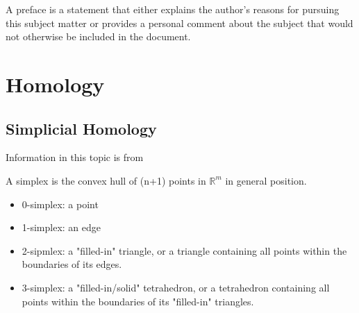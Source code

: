 \documentclass[ma]{uncgdissertationexp2}
\theoremstyle{plain}
\theoremstyle{definition}
\theoremstyle{remark}
\begin{document}
\begin{preface}
A preface is a statement that either explains the author's
reasons for pursuing this subject matter or provides a personal
comment about the subject that would not otherwise be included in
the document.
\end{preface}


\tableofcontents 

\listoftables   


\listoffigures   


\mainmatter %
\chapter{Homology}

\section{Simplicial Homology}

Information in this topic is from \cite{Hatcher_2001}

A simplex is the convex hull of (n+1) points in $\mathbb{R}^{m}$ in general position.
\begin{itemize}
\item 0-simplex: a point
\item 1-simplex: an edge
\item 2-sipmlex: a "filled-in" triangle, or a triangle containing all points within the boundaries of its edges.
\item 3-simplex: a "filled-in/solid" tetrahedron, or a tetrahedron containing all points within the boundaries of its "filled-in" triangles.
\end{itemize}
\end{document}
